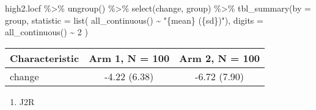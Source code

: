 \documentclass[
  letterpaper,
  DIV=11,
  numbers=noendperiod]{scrreprt}
\newenvironment{Shaded}{\begin{snugshade}}{\end{snugshade}}
\newcommand{\AttributeTok}[1]{\textcolor[rgb]{0.40,0.45,0.13}{#1}}
\newcommand{\DecValTok}[1]{\textcolor[rgb]{0.68,0.00,0.00}{#1}}
\newcommand{\FunctionTok}[1]{\textcolor[rgb]{0.28,0.35,0.67}{#1}}
\newcommand{\NormalTok}[1]{\textcolor[rgb]{0.00,0.23,0.31}{#1}}
\newcommand{\SpecialCharTok}[1]{\textcolor[rgb]{0.37,0.37,0.37}{#1}}
\newcommand{\StringTok}[1]{\textcolor[rgb]{0.13,0.47,0.30}{#1}}
\providecommand{\tightlist}{%
  \setlength{\itemsep}{0pt}\setlength{\parskip}{0pt}}\usepackage{longtable,booktabs,array}
\begin{document}
\begin{Shaded}
\begin{Highlighting}[]
\NormalTok{high2.locf }\SpecialCharTok{\%\textgreater{}\%} \FunctionTok{ungroup}\NormalTok{() }\SpecialCharTok{\%\textgreater{}\%}
  \FunctionTok{select}\NormalTok{(change, group) }\SpecialCharTok{\%\textgreater{}\%}
  \FunctionTok{tbl\_summary}\NormalTok{(}\AttributeTok{by =}\NormalTok{ group,}
              \AttributeTok{statistic =} \FunctionTok{list}\NormalTok{(}
                \FunctionTok{all\_continuous}\NormalTok{() }\SpecialCharTok{\textasciitilde{}} \StringTok{"\{mean\} (\{sd\})"}\NormalTok{), }
              \AttributeTok{digits =} \FunctionTok{all\_continuous}\NormalTok{() }\SpecialCharTok{\textasciitilde{}} \DecValTok{2}\NormalTok{ )}
\end{Highlighting}
\end{Shaded}

\begin{longtable}[]{@{}lcc@{}}
\toprule\noalign{}
\textbf{Characteristic} & \textbf{Arm 1}, N = 100 & \textbf{Arm 2}, N =
100 \\
\midrule\noalign{}
\endhead
\bottomrule\noalign{}
\endlastfoot
change & -4.22 (6.38) & -6.72 (7.90) \\
\end{longtable}

\begin{enumerate}
\def\labelenumi{\arabic{enumi}.}
\setcounter{enumi}{3}
\tightlist
\item
  J2R
\end{enumerate}
\end{document}
